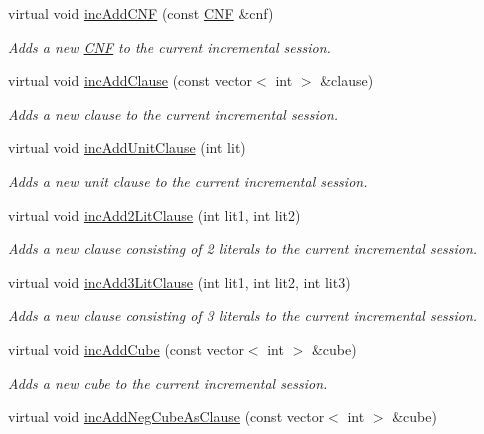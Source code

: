 \begin{DoxyCompactItemize}
virtual void \hyperlink{classPicoSatApi_a619b3cb3b059b06c34f84d9ae123c042}{inc\-Add\-C\-N\-F} (const \hyperlink{classCNF}{C\-N\-F} \&cnf)
\begin{DoxyCompactList}\small\item\em Adds a new \hyperlink{classCNF}{C\-N\-F} to the current incremental session. \end{DoxyCompactList}\item 
virtual void \hyperlink{classPicoSatApi_aaafa1c5c7f1058029127a39a32ceada6}{inc\-Add\-Clause} (const vector$<$ int $>$ \&clause)
\begin{DoxyCompactList}\small\item\em Adds a new clause to the current incremental session. \end{DoxyCompactList}\item 
virtual void \hyperlink{classPicoSatApi_a0ef01830dacfd23f63928b44ff3df788}{inc\-Add\-Unit\-Clause} (int lit)
\begin{DoxyCompactList}\small\item\em Adds a new unit clause to the current incremental session. \end{DoxyCompactList}\item 
virtual void \hyperlink{classPicoSatApi_a5c31301a2b0dfc70251f285e737a6fc2}{inc\-Add2\-Lit\-Clause} (int lit1, int lit2)
\begin{DoxyCompactList}\small\item\em Adds a new clause consisting of 2 literals to the current incremental session. \end{DoxyCompactList}\item 
virtual void \hyperlink{classPicoSatApi_a1daeb6e2b3bfa3eee44a7bf1b278dd86}{inc\-Add3\-Lit\-Clause} (int lit1, int lit2, int lit3)
\begin{DoxyCompactList}\small\item\em Adds a new clause consisting of 3 literals to the current incremental session. \end{DoxyCompactList}\item 
virtual void \hyperlink{classPicoSatApi_ae0a7dd7da9ead164560f454e29457453}{inc\-Add\-Cube} (const vector$<$ int $>$ \&cube)
\begin{DoxyCompactList}\small\item\em Adds a new cube to the current incremental session. \end{DoxyCompactList}\item 
virtual void \hyperlink{classPicoSatApi_ace9bfbd0c8cbd62c3e92d2b208bb7b66}{inc\-Add\-Neg\-Cube\-As\-Clause} (const vector$<$ int $>$ \&cube)

\end{DoxyCompactItemize}
